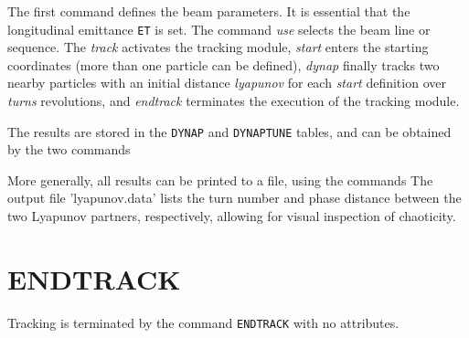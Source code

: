 The first command defines the beam parameters. It is  essential that the
longitudinal emittance {\tt ET} is set. The command \textit{use}
selects the beam line or sequence. The \textit{track} activates the
tracking module, \textit{start } enters the starting coordinates (more
than one particle can be defined),  \textit{dynap} finally tracks two
nearby particles  with an initial distance \textit{lyapunov}  for each
\textit{start} definition over \textit{ turns } revolutions, and
\textit{endtrack} terminates the execution of the tracking module. 

The results are stored in the {\tt DYNAP} and {\tt DYNAPTUNE}
tables, and can be obtained by the two commands  
 

More generally, all results can be printed to a file, using the commands 
The output file 'lyapunov.data' lists the turn number and phase distance
between the  two Lyapunov partners, respectively, allowing for visual
inspection of chaoticity.  
 



\section{ENDTRACK}
\label{sec:endtrack}

Tracking is terminated by the command \texttt{ENDTRACK} with no
attributes. 





